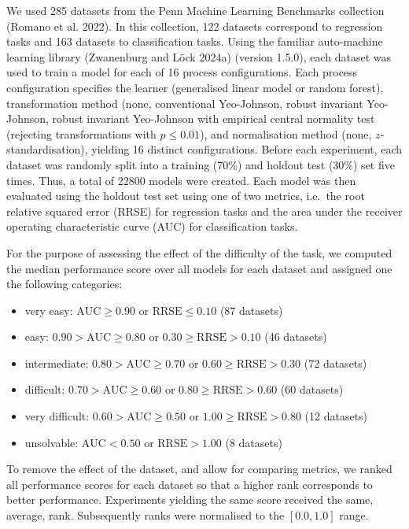 \documentclass[preprint,12pt,authoryear]{elsarticle}
\begin{document}
We used 285 datasets from the Penn Machine Learning Benchmarks
collection (Romano et al. 2022). In this collection, 122 datasets
correspond to regression tasks and 163 datasets to classification tasks.
Using the familiar auto-machine learning library (Zwanenburg and Löck
2024a) (version 1.5.0), each dataset was used to train a model for each
of 16 process configurations. Each process configuration specifies the
learner (generalised linear model or random forest), transformation
method (none, conventional Yeo-Johnson, robust invariant Yeo-Johnson,
robust invariant Yeo-Johnson with empirical central normality test
(rejecting transformations with \(p \leq 0.01\)), and normalisation
method (none, \(z\)-standardisation), yielding 16 distinct
configurations. Before each experiment, each dataset was randomly split
into a training (70\%) and holdout test (30\%) set five times. Thus, a
total of 22800 models were created. Each model was then evaluated using
the holdout test set using one of two metrics, i.e.~the root relative
squared error (RRSE) for regression tasks and the area under the
receiver operating characteristic curve (AUC) for classification tasks.

For the purpose of assessing the effect of the difficulty of the task,
we computed the median performance score over all models for each
dataset and assigned one the following categories:

\begin{itemize}
\item
  very easy: \(\text{AUC} \geq 0.90\) or \(\text{RRSE} \leq 0.10\) (87
  datasets)
\item
  easy: \(0.90 > \text{AUC} \geq 0.80\) or
  \(0.30 \geq \text{RRSE} > 0.10\) (46 datasets)
\item
  intermediate: \(0.80 > \text{AUC} \geq 0.70\) or
  \(0.60 \geq \text{RRSE} > 0.30\) (72 datasets)
\item
  difficult: \(0.70 > \text{AUC} \geq 0.60\) or
  \(0.80 \geq \text{RRSE} > 0.60\) (60 datasets)
\item
  very difficult: \(0.60 > \text{AUC} \geq 0.50\) or
  \(1.00 \geq \text{RRSE} > 0.80\) (12 datasets)
\item
  unsolvable: \(\text{AUC} < 0.50\) or \(\text{RRSE} > 1.00\) (8
  datasets)
\end{itemize}

To remove the effect of the dataset, and allow for comparing metrics, we
ranked all performance scores for each dataset so that a higher rank
corresponds to better performance. Experiments yielding the same score
received the same, average, rank. Subsequently ranks were normalised to
the \([0.0, 1.0]\) range.
\end{document}

